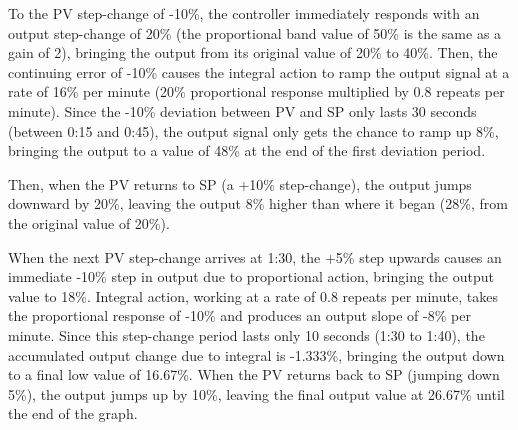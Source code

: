 To the PV step-change of -10\%, the controller immediately responds with an output step-change of 20\% (the proportional band value of 50\% is the same as a gain of 2), bringing the output from its original value of 20\% to 40\%.  Then, the continuing error of -10\% causes the integral action to ramp the output signal at a rate of 16\% per minute (20\% proportional response multiplied by 0.8 repeats per minute).  Since the -10\% deviation between PV and SP only lasts 30 seconds (between 0:15 and 0:45), the output signal only gets the chance to ramp up 8\%, bringing the output to a value of 48\% at the end of the first deviation period.

Then, when the PV returns to SP (a +10\% step-change), the output jumps downward by 20\%, leaving the output 8\% higher than where it began (28\%, from the original value of 20\%).

When the next PV step-change arrives at 1:30, the +5\% step upwards causes an immediate -10\% step in output due to proportional action, bringing the output value to 18\%.  Integral action, working at a rate of 0.8 repeats per minute, takes the proportional response of -10\% and produces an output slope of -8\% per minute.  Since this step-change period lasts only 10 seconds (1:30 to 1:40), the accumulated output change due to integral is -1.333\%, bringing the output down to a final low value of 16.67\%.  When the PV returns back to SP (jumping down 5\%), the output jumps up by 10\%, leaving the final output value at 26.67\% until the end of the graph.











